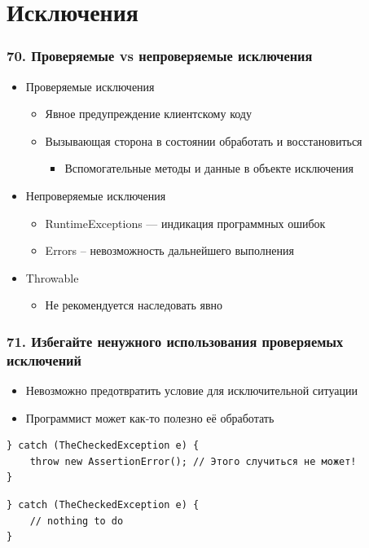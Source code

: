 \documentclass[xetex,mathserif,serif]{beamer}
\begin{document}
	\section{Исключения}

	\begin{frame}
		\frametitle{70. Проверяемые vs непроверяемые исключения}
		\begin{itemize}
			\item Проверяемые исключения
			\begin{itemize}
				\item Явное предупреждение клиентскому коду
				\item Вызывающая сторона в состоянии обработать и восстановиться
				\begin{itemize}
					\item Вспомогательные методы и данные в объекте исключения
				\end{itemize}
			\end{itemize}
			\item Непроверяемые исключения
			\begin{itemize}
				\item RuntimeExceptions --- индикация программных ошибок
				\item Errors -- невозможность дальнейшего выполнения
			\end{itemize}
			\item Throwable
			\begin{itemize}
				\item Не рекомендуется наследовать явно
			\end{itemize}
		\end{itemize}
	\end{frame}

	\begin{frame}[fragile]
		\frametitle{71. Избегайте ненужного использования проверяемых исключений}
		\begin{itemize}
			\item Невозможно предотвратить условие для исключительной ситуации
			\item Программист может как-то полезно её обработать
		\end{itemize}
		\begin{verbatim}
} catch (TheCheckedException е) {
    throw new AssertionError(); // Этого случиться не может!
}
		\end{verbatim}
		\vspace{3mm}
		\begin{verbatim}
} catch (TheCheckedException е) {
    // nothing to do
}
		\end{verbatim}
	\end{frame}
\end{document}

